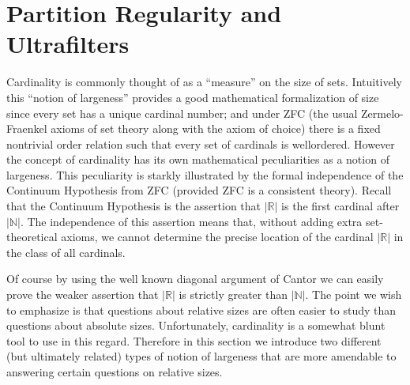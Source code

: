 \documentclass[12pt]{article}
\theoremstyle{plain}
\theoremstyle{definition}
\newcommand{\bbN}{\mathbb{N}}
\newcommand{\bbR}{\mathbb{R}}
\begin{document}
\section{Partition Regularity and Ultrafilters}
Cardinality is commonly thought of as a ``measure'' on the size of sets.
Intuitively this ``notion of largeness'' provides a good mathematical
formalization of size since every set has a unique cardinal number;
and under ZFC (the usual Zermelo-Fraenkel axioms of set theory along
with the axiom of choice) there is a fixed nontrivial order relation
such that every set of cardinals is wellordered.
However the concept of cardinality has its own mathematical
peculiarities as a notion of largeness.
This peculiarity is starkly illustrated by the formal independence of
the Continuum Hypothesis from ZFC (provided ZFC is a consistent
theory).
Recall that the Continuum Hypothesis is the assertion that $|\bbR|$ is
the first cardinal after $|\bbN|$.
The independence of this assertion means that, without adding extra
set-theoretical axioms, we cannot determine the precise location of
the cardinal $|\bbR|$ in the class of all cardinals.

Of course by using the well known diagonal argument of Cantor%
we can easily prove the weaker assertion that $|\bbR|$ is strictly
greater than $|\bbN|$.
The point we wish to emphasize is that questions about relative sizes
are often easier to study than questions about absolute sizes.
Unfortunately, cardinality is a somewhat blunt tool to use in this
regard.
Therefore in this section we introduce two different (but ultimately
related) types of notion of largeness that are more amendable to
answering certain questions on relative sizes.
\end{document}
